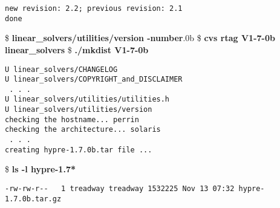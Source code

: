 \begin{ttfamily}
\begin{mdseries}
\begin{verbatim}
new revision: 2.2; previous revision: 2.1
done
\end{verbatim}
\$ \textbf{linear\_solvers/utilities/version -number}.0b\linebreak
\$ \textbf{cvs rtag V1-7-0b linear\_solvers}\linebreak
\$ \textbf{./mkdist V1-7-0b}\linebreak
\begin{verbatim}
U linear_solvers/CHANGELOG
U linear_solvers/COPYRIGHT_and_DISCLAIMER
 . . .
U linear_solvers/utilities/utilities.h
U linear_solvers/utilities/version
checking the hostname... perrin
checking the architecture... solaris
 . . .
creating hypre-1.7.0b.tar file ...
\end{verbatim}
\$ \textbf{ls -l hypre-1.7*}\linebreak
\begin{verbatim}
-rw-rw-r--   1 treadway treadway 1532225 Nov 13 07:32 hypre-1.7.0b.tar.gz


\end{verbatim}
\end{mdseries}
\end{ttfamily}
